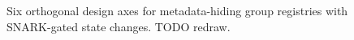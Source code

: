 %
\begin{figure}[t]
  \centering
  \caption{Six orthogonal design axes for metadata-hiding group
    registries with SNARK-gated state changes. TODO redraw.}
  \label{fig:axes}
\end{figure}
